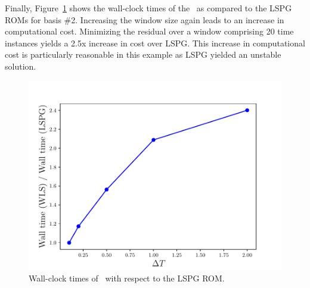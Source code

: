 Finally, Figure~\ref{fig:cav_wallclock} shows the wall-clock times of the \methodAcronymROMs\ as compared to the LSPG ROMs for basis \#2. Increasing the window size again leads to an increase in computational cost. Minimizing the residual over a window comprising 20 time instances yields a 2.5x increase in cost over LSPG. This increase in computational cost is particularly reasonable in this example as LSPG yielded an unstable solution. 
\begin{figure}
\begin{center}
\includegraphics[trim={0cm 0cm 0cm 0cm},clip,width=0.49\linewidth]{figs/cavity/walltime_vs_window_compare.pdf}
\caption{Wall-clock times of \methodAcronymROMs\ with respect to the LSPG ROM.}
\label{fig:cav_wallclock}
\end{center}
\end{figure}



